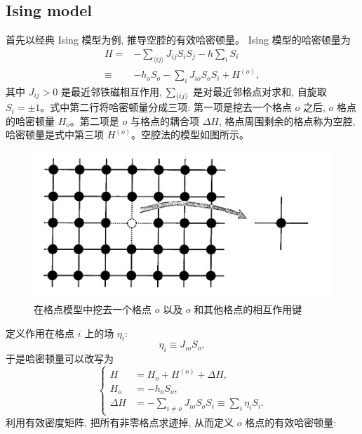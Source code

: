 \subsection{Ising model}
首先以经典 Ising 模型为例, 推导空腔的有效哈密顿量。 Ising 模型的哈密顿量为 
\begin{equation}
    \begin{aligned}
        H=&-\sum_{\langle ij \rangle}J_{ij}S_iS_j-h\sum_iS_i\\
        \equiv&-h_oS_o-\sum_i J_{io}S_oS_i+H^{(o)},
    \end{aligned}
\end{equation}
其中 $J_{ij}>0$ 是最近邻铁磁相互作用, $\sum_{\langle ij \rangle}$ 是对最近邻格点对求和, 自旋取 $S_i=\pm 1$。式中第二行将哈密顿量分成三项: 第一项是挖去一个格点 $o$ 之后, $o$ 格点的哈密顿量 $H_o$。第二项是 $o$ 与格点的耦合项 $\Delta H$, 格点周围剩余的格点称为空腔, 哈密顿量是式中第三项 $H^{(o)}$。空腔法的模型如图所示。
\begin{figure}[H]
    \vspace{13pt} %
    \centering
    \includegraphics[width=5in]{Img/cavity-method.png}
    \caption{在格点模型中挖去一个格点 $o$ 以及 $o$ 和其他格点的相互作用键} 
\end{figure}
定义作用在格点 $i$ 上的场 $\eta_i$:
\begin{equation}
    \eta_i\equiv J_{io}S_o,
\end{equation}
于是哈密顿量可以改写为 
\begin{equation}
    \left\{
        \begin{aligned}
            H&=H_o+H^{(o)}+\Delta H,\\
            H_o&=-h_oS_o,\\
            \Delta H&=-\sum_{i\ne o}J_{io}S_oS_i\equiv\sum_i\eta_iS_i.
        \end{aligned}
    \right.
\end{equation}
利用有效密度矩阵, 把所有非零格点求迹掉, 从而定义 $o$ 格点的有效哈密顿量:
